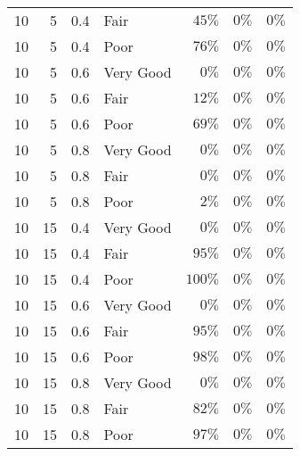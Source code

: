 \begin{longtable}{rrrlrrr}
10 & 5 & 0.4 & Fair & $45\%$ & $0\%$ & $0\%$ \\ 
10 & 5 & 0.4 & Poor & $76\%$ & $0\%$ & $0\%$ \\ 
10 & 5 & 0.6 & Very Good & $0\%$ & $0\%$ & $0\%$ \\ 
10 & 5 & 0.6 & Fair & $12\%$ & $0\%$ & $0\%$ \\ 
10 & 5 & 0.6 & Poor & $69\%$ & $0\%$ & $0\%$ \\ 
10 & 5 & 0.8 & Very Good & $0\%$ & $0\%$ & $0\%$ \\ 
10 & 5 & 0.8 & Fair & $0\%$ & $0\%$ & $0\%$ \\ 
10 & 5 & 0.8 & Poor & $2\%$ & $0\%$ & $0\%$ \\ 
10 & 15 & 0.4 & Very Good & $0\%$ & $0\%$ & $0\%$ \\ 
10 & 15 & 0.4 & Fair & $95\%$ & $0\%$ & $0\%$ \\ 
10 & 15 & 0.4 & Poor & $100\%$ & $0\%$ & $0\%$ \\ 
10 & 15 & 0.6 & Very Good & $0\%$ & $0\%$ & $0\%$ \\ 
10 & 15 & 0.6 & Fair & $95\%$ & $0\%$ & $0\%$ \\ 
10 & 15 & 0.6 & Poor & $98\%$ & $0\%$ & $0\%$ \\ 
10 & 15 & 0.8 & Very Good & $0\%$ & $0\%$ & $0\%$ \\ 
10 & 15 & 0.8 & Fair & $82\%$ & $0\%$ & $0\%$ \\ 
10 & 15 & 0.8 & Poor & $97\%$ & $0\%$ & $0\%$ \\ 
 \bottomrule
\end{longtable}

